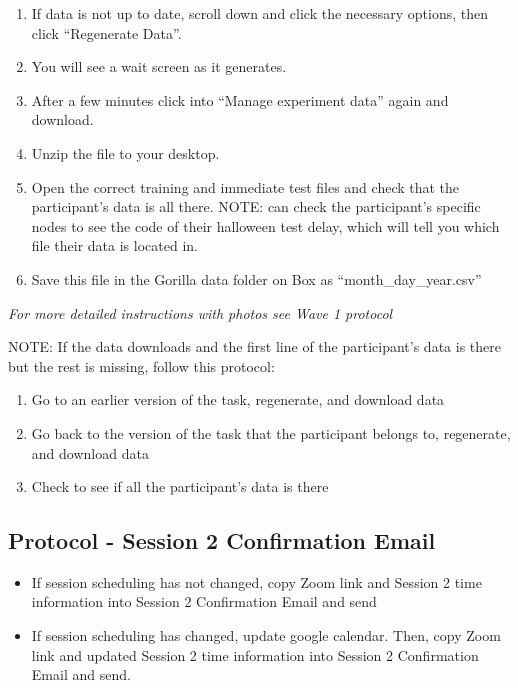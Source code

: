 \documentclass[]{book}
\begin{document}
\begin{enumerate}
\def\labelenumi{\arabic{enumi}.}
\setcounter{enumi}{2}
\item
  If data is not up to date, scroll down and click the necessary options, then click ``Regenerate Data''.
\item
  You will see a wait screen as it generates.
\item
  After a few minutes click into ``Manage experiment data'' again and download.
\item
  Unzip the file to your desktop.
\item
  Open the correct training and immediate test files and check that the participant's data is all there. NOTE: can check the participant's specific nodes to see the code of their halloween test delay, which will tell you which file their data is located in.
\item
  Save this file in the Gorilla data folder on Box as ``month\_day\_year.csv''
\end{enumerate}

\emph{For more detailed instructions with photos see Wave 1 protocol}

NOTE: If the data downloads and the first line of the participant's data is there but the rest is missing, follow this protocol:

\begin{enumerate}
\def\labelenumi{\arabic{enumi}.}
\item
  Go to an earlier version of the task, regenerate, and download data
\item
  Go back to the version of the task that the participant belongs to, regenerate, and download data
\item
  Check to see if all the participant's data is there
\end{enumerate}

\hypertarget{protocol---session-2-confirmation-email-1}{%
\subsection{Protocol - Session 2 Confirmation Email}\label{protocol---session-2-confirmation-email-1}}

\begin{itemize}
\item
  If session scheduling has not changed, copy Zoom link and Session 2 time information into Session 2 Confirmation Email and send
\item
  If session scheduling has changed, update google calendar. Then, copy Zoom link and updated Session 2 time information into Session 2 Confirmation Email and send.
\end{itemize}
\end{document}
